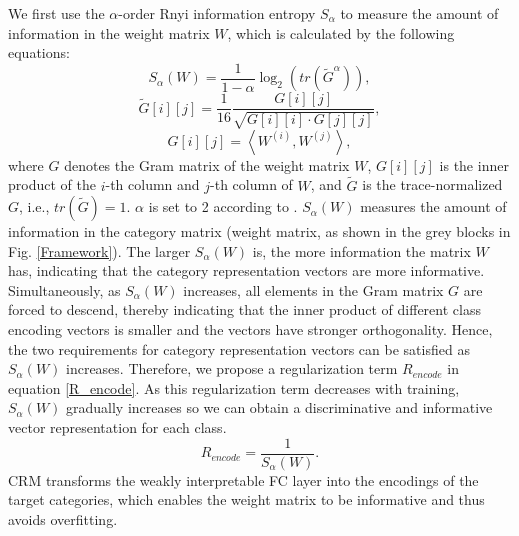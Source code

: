 \documentclass[letterpaper]{article}
\begin{document}
We first use the $\alpha$-order Rnyi information entropy $S_\alpha$ to measure the amount of information in the weight matrix $W$, which is calculated by the following equations:
\begin{equation}
\label{S_alpha}
{S_\alpha }(W) = \frac{1}{{1 - \alpha }}{\log _2}(tr({\tilde G^\alpha })),
\end{equation}
\begin{equation}
\label{G tilde}
\tilde G[i][j] = \frac{1}{{16}}\frac{{G[i][j]}}{{\sqrt {G[i][i] \cdot G[j][j]} }},
\end{equation}
\begin{equation}
\label{G}
G[i][j] = \left\langle {{W^{(i)}},{W^{(j)}}} \right\rangle,
\end{equation}
where $G$ denotes the Gram matrix of the weight matrix $W$, $G[i][j]$ is the inner product of the $i$-th column and $j$-th column of $W$, and $\tilde G$ is the trace-normalized $G$, i.e., $tr(\tilde G)=1$. $\alpha$ is set to 2 according to \cite{8787866, 8998186}.
${S_\alpha}(W)$ measures the amount of information in the category matrix (weight matrix, as shown in the grey blocks in Fig. \ref{Framework}). The larger ${S_\alpha}(W)$ is, the more information the matrix $W$ has, indicating that the category representation vectors are more informative. Simultaneously, as ${S_\alpha}(W)$ increases, all elements in the Gram matrix $G$ are forced to descend, thereby indicating that the inner product of different class encoding vectors is smaller and the vectors have stronger orthogonality. Hence, the two requirements for category representation vectors can be satisfied as ${S_\alpha}(W)$ increases. Therefore, we propose a regularization term $R_{encode}$ in equation \ref{R_encode}. As this regularization term decreases with training, ${S_\alpha}(W)$ gradually increases so we can obtain a discriminative and informative vector representation for each class.
\begin{equation}
\label{R_encode}
{R_{encode}} = \frac{1}{{{S_\alpha}(W)}}.
\end{equation}
CRM transforms the weakly interpretable FC layer into the encodings of the target categories, which enables the weight matrix to be informative and thus avoids overfitting.
\end{document}
